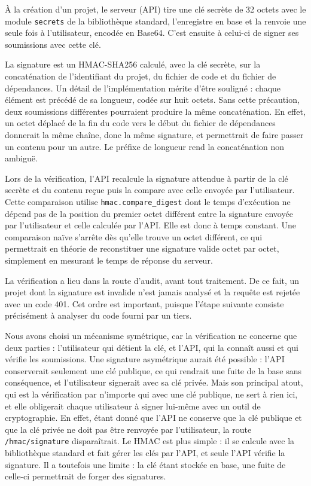 \documentclass[a4paper,12pt]{article}
\begin{document}
À la création d'un projet, le serveur (API) tire une clé secrète de 32
octets avec le module \texttt{secrets} de la bibliothèque standard,
l'enregistre en base et la renvoie une seule fois à l'utilisateur,
encodée en Base64. C'est ensuite à celui-ci de signer ses soumissions
avec cette clé.

La signature est un HMAC-SHA256 calculé, avec la clé secrète, sur la
concaténation de l'identifiant du projet, du fichier de code et du
fichier de dépendances. Un détail de l'implémentation mérite d'être
souligné : chaque élément est précédé de sa longueur, codée sur huit
octets. Sans cette précaution, deux soumissions différentes pourraient
produire la même concaténation. En effet, un octet déplacé de la fin du
code vers le début du fichier de dépendances donnerait la même chaîne,
donc la même signature, et permettrait de faire passer un contenu pour
un autre. Le préfixe de longueur rend la concaténation non ambiguë.

Lors de la vérification, l'API recalcule la signature attendue à partir
de la clé secrète et du contenu reçue puis la compare avec celle envoyée
par l'utilisateur. Cette comparaison utilise
\texttt{hmac.\allowbreak{}compare\_\allowbreak{}digest} dont le temps
d'exécution ne dépend pas de la position du premier octet différent
entre la signature envoyée par l'utilisateur et celle calculée par
l'API. Elle est donc à temps constant. Une comparaison naïve s'arrête
dès qu'elle trouve un octet différent, ce qui permettrait en théorie de
reconstituer une signature valide octet par octet, simplement en
mesurant le temps de réponse du serveur.

La vérification a lieu dans la route d'audit, avant tout traitement. De
ce fait, un projet dont la signature est invalide n'est jamais analysé
et la requête est rejetée avec un code 401. Cet ordre est important,
puisque l'étape suivante consiste précisément à analyser du code fourni
par un tiers.

Nous avons choisi un mécanisme symétrique, car la vérification ne
concerne que deux parties : l'utilisateur qui détient la clé, et l'API,
qui la connaît aussi et qui vérifie les soumissions. Une signature
asymétrique aurait été possible : l'API conserverait seulement une clé
publique, ce qui rendrait une fuite de la base sans conséquence, et
l'utilisateur signerait avec sa clé privée. Mais son principal atout,
qui est la vérification par n'importe qui avec une clé publique, ne sert
à rien ici, et elle obligerait chaque utilisateur à signer lui-même avec
un outil de cryptographie. En effet, étant donné que l'API ne conserve
que la clé publique et que la clé privée ne doit pas être renvoyée par
l'utilisateur, la route
\texttt{/\allowbreak{}hmac/\allowbreak{}signature} disparaîtrait. Le
HMAC est plus simple : il se calcule avec la bibliothèque standard et
fait gérer les clés par l'API, et seule l'API vérifie la signature. Il a
toutefois une limite : la clé étant stockée en base, une fuite de
celle-ci permettrait de forger des signatures.
\end{document}
